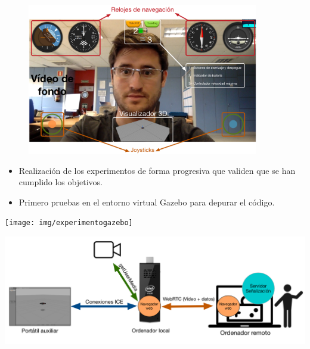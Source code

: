 \documentclass[notes,slidesec,a4]{seminar}
\begin{document}
\begin{hslide}
\begin{center}
\begin{figure}
\includegraphics[width=0.9\textwidth]{img/interfazweb}
\end{figure}
\end{center}
\end{hslide}


\begin{hslide}
\begin{itemize}
\item Realización de los experimentos de forma progresiva que validen que se han cumplido los objetivos.
\item Primero pruebas en el entorno virtual Gazebo para depurar el código.
\end{itemize}

\begin{minipage}[t]{0.3\textwidth}
\texttt{[image: img/experimentogazebo]}
\end{minipage}
\begin{minipage}[t]{0.7\textwidth}
\includegraphics[width=\textwidth]{img/experimento1}
\end{minipage}
\end{hslide}
\end{document}

